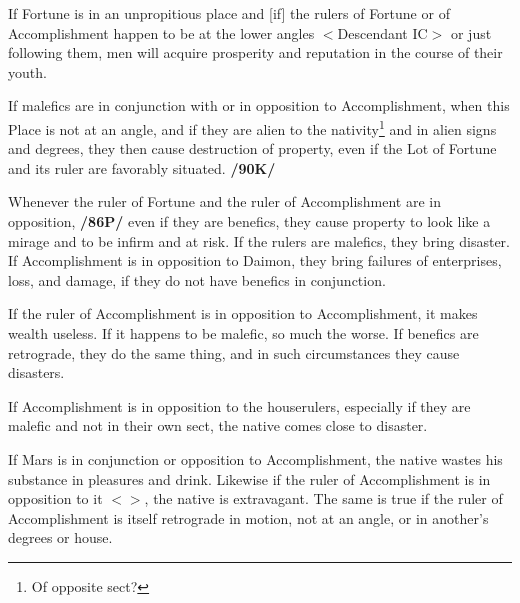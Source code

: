 If Fortune is in an unpropitious place and [if] the rulers of Fortune or of Accomplishment happen to be at the lower angles $<$Descendant IC$>$ or just following them, men will acquire prosperity and reputation in the course of their youth. 

If malefics are in conjunction with or in opposition to Accomplishment, when this Place is not at an angle, and if they are alien to the nativity\footnote{Of opposite sect?} and in alien signs and degrees, they then cause destruction of property, even if the Lot of Fortune and its ruler are favorably situated. \textbf{/90K/}

Whenever the ruler of Fortune and the ruler of Accomplishment are in opposition, \textbf{/86P/} even if they are benefics, they cause property to look like a mirage and to be infirm and at risk. If the rulers are malefics, they bring disaster. If Accomplishment is in opposition to Daimon, they bring failures of enterprises, loss, and damage, if they do not have benefics in conjunction. 

If the ruler of Accomplishment is in opposition to Accomplishment, it makes wealth useless. If it happens to be malefic, so much the worse. \mnbm If benefics are retrograde, they do the same thing, and in such circumstances they cause disasters. 

If Accomplishment is in opposition to the houserulers, especially if they are malefic and not in their own sect, the native comes close to disaster. 

If Mars is in conjunction or opposition to Accomplishment, the native wastes his substance in pleasures and drink. Likewise if the ruler of Accomplishment is in
opposition to it $<$\Mars$>$, the native is extravagant. The same is true if the ruler of Accomplishment is itself retrograde in motion, not at an angle, or in another’s degrees or house.

\newpage